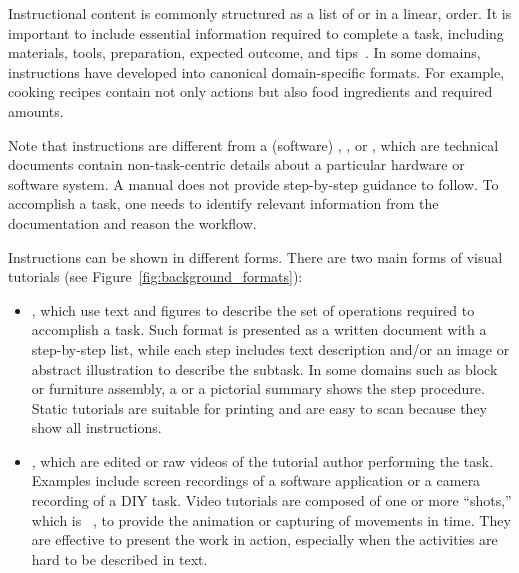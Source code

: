 %
Instructional content is commonly structured as a list of  or  in a linear,  order.
%
It is important to include essential information required to complete a task, including materials, tools, preparation, expected outcome, and tips~\cite{Torrey:2007he}.
%
In some domains, instructions have developed into canonical domain-specific formats. For example, cooking recipes contain not only actions but also food ingredients and required amounts.

Note that instructions are different from a (software) , , or , which are technical documents contain non-task-centric details about a particular hardware or software system. A manual does not provide step-by-step guidance to follow. To accomplish a task, one needs to identify relevant information from the documentation and reason the workflow.


Instructions can be shown in different forms. There are two main forms of visual tutorials (see Figure~\ref{fig:background_formats}):
\begin{itemize}
  \item {}, which use text and figures to describe the set of operations required to accomplish a task. Such format is presented as a written document with a step-by-step list, while each step includes text description and/or an image or abstract illustration to describe the subtask. In some domains such as block or furniture assembly, a  or a pictorial summary shows the step procedure. Static tutorials are suitable for printing and are easy to scan because they show all instructions.
  \item {}, which are edited or raw videos of the tutorial author performing the task. Examples include screen recordings of a software application or a camera recording of a DIY task.
  Video tutorials are composed of one or more ``shots,'' which is ~\cite{Goldman:2007:FVA:1354647}, to provide the animation or capturing of movements in time.
  They are effective to present the work in action, especially when the activities are hard to be described in text.
\end{itemize}

